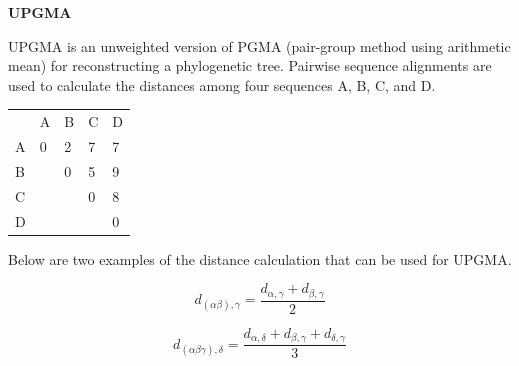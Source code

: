 \question \textbf{UPGMA}

UPGMA is an unweighted version of PGMA (pair-group method using arithmetic mean) for reconstructing a phylogenetic tree. Pairwise sequence alignments are used to calculate the distances among four sequences A, B, C, and D.

\begin{table}[H]
\centering
\begin{tabular}{lllll}
                       & A                      & B                      & C                      & D                      \\ \cline{2-5} 
\multicolumn{1}{l|}{A} & \multicolumn{1}{l|}{0} & \multicolumn{1}{l|}{2} & \multicolumn{1}{l|}{7} & \multicolumn{1}{l|}{7} \\ \cline{2-5} 
B                      & \multicolumn{1}{l|}{}  & \multicolumn{1}{l|}{0} & \multicolumn{1}{l|}{5} & \multicolumn{1}{l|}{9} \\ \cline{3-5} 
C                      &                        & \multicolumn{1}{l|}{}  & \multicolumn{1}{l|}{0} & \multicolumn{1}{l|}{8} \\ \cline{4-5} 
D                      &                        &                        & \multicolumn{1}{l|}{}  & \multicolumn{1}{l|}{0} \\ \cline{5-5} 
\end{tabular}
\end{table}

Below are two examples of the distance calculation that can be used for UPGMA.

\[
d_{(\alpha\beta),\gamma}=\dfrac{d_{\alpha,\gamma} + d_{\beta,\gamma}}{2}
\]

\[
d_{(\alpha\beta\gamma),\delta}=\dfrac{d_{\alpha,\delta} + d_{\beta,\gamma} + d_{\delta,\gamma}}{3}
\]

